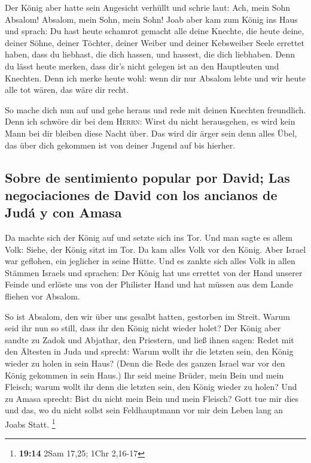  Der König aber hatte sein Angesicht verhüllt und schrie
laut: Ach, mein Sohn Absalom! Absalom, mein Sohn, mein Sohn!
 Joab aber kam zum König ins Haus und sprach: Du hast
heute schamrot gemacht alle deine Knechte, die heute deine, deiner
Söhne, deiner Töchter, deiner Weiber und deiner Kebsweiber Seele
errettet haben,  dass du liebhast, die dich hassen, und
hassest, die dich liebhaben. Denn du lässt heute merken, dass dir's
nicht gelegen ist an den Hauptleuten und Knechten. Denn ich merke heute
wohl: wenn dir nur Absalom lebte und wir heute alle tot wären, das wäre
dir recht.

 So mache dich nun auf und gehe heraus und rede mit deinen
Knechten freundlich. Denn ich schwöre dir bei dem \textsc{Herrn}: Wirst
du nicht herausgehen, es wird kein Mann bei dir bleiben diese Nacht
über. Das wird dir ärger sein denn alles Übel, das über dich gekommen
ist von deiner Jugend auf bis hierher.

\hypertarget{sobre-de-sentimiento-popular-por-david-las-negociaciones-de-david-con-los-ancianos-de-juduxe1-y-con-amasa}{%
\subsection{Sobre de sentimiento popular por David; Las negociaciones de
David con los ancianos de Judá y con
Amasa}\label{sobre-de-sentimiento-popular-por-david-las-negociaciones-de-david-con-los-ancianos-de-juduxe1-y-con-amasa}}

 Da machte sich der König auf und setzte sich ins Tor. Und
man sagte es allem Volk: Siehe, der König sitzt im Tor. Da kam alles
Volk vor den König. Aber Israel war geflohen, ein jeglicher in seine
Hütte.  Und es zankte sich alles Volk in allen Stämmen
Israels und sprachen: Der König hat uns errettet von der Hand unserer
Feinde und erlöste uns von der Philister Hand und hat müssen aus dem
Lande fliehen vor Absalom.

 So ist Absalom, den wir über uns gesalbt hatten,
gestorben im Streit. Warum seid ihr nun so still, dass ihr den König
nicht wieder holet?  Der König aber sandte zu Zadok und
Abjathar, den Priestern, und ließ ihnen sagen: Redet mit den Ältesten in
Juda und sprecht: Warum wollt ihr die letzten sein, den König wieder zu
holen in sein Haus? (Denn die Rede des ganzen Israel war vor den König
gekommen in sein Haus.)  Ihr seid meine Brüder, mein Bein
und mein Fleisch; warum wollt ihr denn die letzten sein, den König
wieder zu holen?  Und zu Amasa sprecht: Bist du nicht
mein Bein und mein Fleisch? Gott tue mir dies und das, wo du nicht
sollst sein Feldhauptmann vor mir dein Leben lang an Joabs Statt.
\footnote{\textbf{19:14} 2Sam 17,25; 1Chr 2,16-17}

